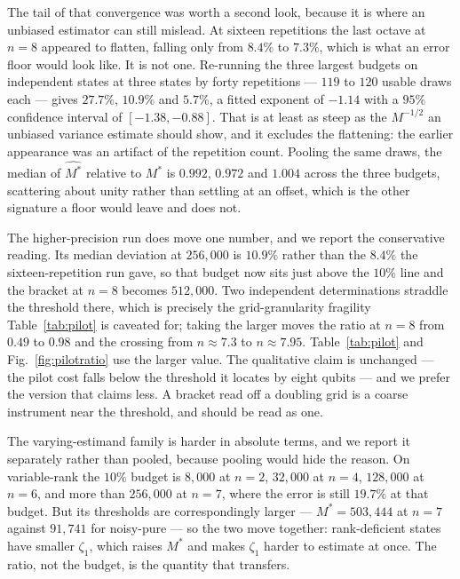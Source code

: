 The tail of that convergence was worth a second look, because it is where an unbiased estimator
can still mislead. At sixteen repetitions the last octave at \(n = 8\) appeared to flatten,
falling only from \(8.4\%\) to \(7.3\%\), which is what an error floor would look like. It is not
one. Re-running the three largest budgets on independent states at three states by forty
repetitions --- \(119\) to \(120\) usable draws each --- gives \(27.7\%\), \(10.9\%\) and
\(5.7\%\), a fitted exponent of \(-1.14\)
with a \(95\%\) confidence interval of \([-1.38, -0.88]\). That is at least as steep as the
\(M^{-1/2}\) an unbiased variance estimate should show, and it excludes the flattening: the
earlier appearance was an artifact of the repetition count. Pooling the same draws, the
median of \(\widehat{M^*}\) relative to \(M^*\) is \(0.992\), \(0.972\) and \(1.004\) across the
three budgets, scattering about unity rather than settling at an offset, which is the other
signature a floor would leave and does not.

The higher-precision run does move one number, and we report the conservative reading. Its median
deviation at \(256{,}000\) is \(10.9\%\) rather than the \(8.4\%\) the sixteen-repetition run
gave, so that budget now sits just above the \(10\%\) line and the bracket at \(n = 8\) becomes
\(512{,}000\). Two independent determinations straddle the threshold there, which is precisely
the grid-granularity fragility Table~\ref{tab:pilot} is caveated for; taking the larger moves the
ratio at \(n = 8\) from \(0.49\) to \(0.98\) and the crossing from \(n \approx 7.3\) to
\(n \approx 7.95\). Table~\ref{tab:pilot} and Fig.~\ref{fig:pilotratio} use the larger value. The
qualitative claim is unchanged --- the pilot cost falls below the threshold it locates by eight
qubits --- and we prefer the version that claims less. A bracket read off a doubling grid is a
coarse instrument near the threshold, and should be read as one.

The varying-estimand family is harder in absolute terms, and we report it separately rather than
pooled, because pooling would hide the reason. On variable-rank the \(10\%\) budget is
\(8{,}000\) at \(n = 2\), \(32{,}000\) at \(n = 4\), \(128{,}000\) at \(n = 6\), and more than
\(256{,}000\) at \(n = 7\), where the error is still \(19.7\%\) at that budget. But its thresholds
are correspondingly larger --- \(M^* = 503{,}444\) at \(n = 7\) against \(91{,}741\) for
noisy-pure --- so the two move together: rank-deficient states have smaller \(\zeta_1\), which
raises \(M^*\) and makes \(\zeta_1\) harder to estimate at once. The ratio, not the budget, is the
quantity that transfers.

